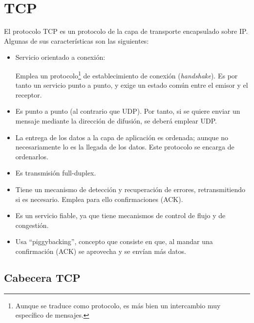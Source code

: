 \section{\acrfull{TCP}}
El protocolo \acrshort{TCP} es un protocolo de la capa de transporte encapsulado sobre \acrshort{IP}. Algunas de sus características son las siguientes:
\begin{itemize}
    \item Servicio orientado a conexión:
    
    Emplea un protocolo\footnote{Aunque se traduce como protocolo, es más bien un intercambio muy específico de mensajes.} de establecimiento de conexión (\textit{handshake}). Es por tanto un servicio punto a punto, y exige un estado común entre el emisor y el receptor. 
    
    \item Es punto a punto (al contrario que \acrshort{UDP}). Por tanto, si se quiere enviar un mensaje mediante la dirección de difusión, se deberá emplear \acrshort{UDP}.
    
    \item La entrega de los datos a la capa de aplicación es ordenada; aunque no necesariamente lo es la llegada de los datos. Este protocolo se encarga de ordenarlos.
    \item Es transmisión full-duplex.
    \item Tiene un mecanismo de detección y recuperación de errores, retransmitiendo si es necesario. Emplea para ello confirmaciones (\acrshort{ACK}).
    \item Es un servicio fiable, ya que tiene mecanismos de control de flujo y de congestión.
    \item Usa ``piggybacking'', concepto que consiste en que, al mandar una confirmación (\acrshort{ACK}) se aprovecha y se envían más datos.
\end{itemize}

\subsection{Cabecera \acrshort{TCP}}

